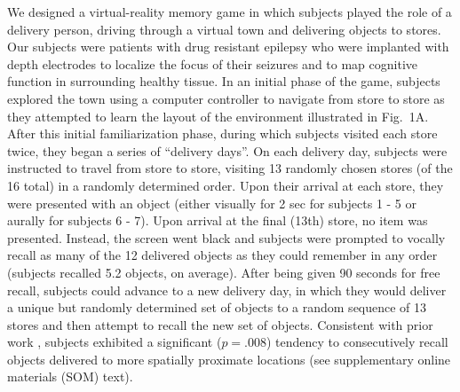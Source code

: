 We designed a virtual-reality memory game in which subjects played the role of a delivery person, driving through a virtual town and delivering objects to stores.  Our subjects were patients with drug resistant epilepsy who were implanted with depth electrodes to localize the focus of their seizures and to map cognitive function in surrounding healthy tissue. In an initial phase of the game, subjects explored the town using a computer controller to navigate from store to store as they attempted to learn the layout of the environment illustrated in Fig.~1A.  After this initial familiarization phase, during which subjects visited each store twice, they began a series of ``delivery days''.  On each delivery day, subjects were instructed to travel from store to store, visiting 13 randomly chosen stores (of the 16 total) in a randomly determined order.  Upon their arrival at each store, they were presented with an object (either visually for 2 sec for subjects 1 - 5 or aurally for subjects 6 - 7).  Upon arrival at the final (13th) store, no item was presented. Instead, the screen went black and subjects were prompted to vocally recall as many of the 12 delivered objects as they could remember in any order (subjects recalled 5.2 objects, on average).  After being given 90 seconds for free recall, subjects could advance to a new delivery day, in which they would deliver a unique but randomly determined set of objects to a random sequence of 13 stores and then attempt to recall the new set of objects. Consistent with prior work \cite{MillEtal12a}, subjects exhibited a significant ($p=.008$) tendency to consecutively recall objects delivered to more spatially proximate locations (see supplementary online materials (SOM) text).

